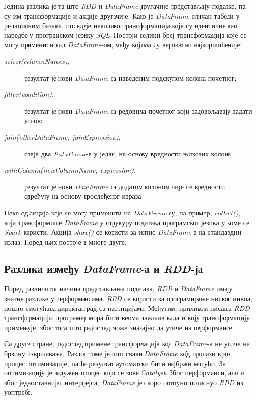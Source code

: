 \documentclass[12pt,oneside]{memoir}
\begin{document}
Једина разлика је та што \textit{RDD} и \textit{DataFrame} другачије представљају податке, па су им трансформације и акције другачије. Како је \textit{DataFrame} сличан табели у релационим базама, поседује неколико трансформација које су идентичне као наредбе у програмском језику \textit{SQL}. Постоји велики број трансформација које се могу применити над \textit{DataFrame}-ом, међу којима су вероватно најкоришћеније: \cite{spark_guide}

\begin{description} 
	\item[\textit{select(columnNames)},] резултат је нови \textit{DataFrame} са наведеним подскупом колона почетног;
	\item[\textit{filter(condition)},] резултат је нови \textit{DataFrame} са редовима почетног који задовољавају задати услов;
	\item[\textit{join(otherDataFrame, joinExpression)},] спаја два \textit{DataFrame}-а у један, на основу вредности њихових колона;
	\item[\textit{withColumn(newColumnName, expression)},] резултат је нови \textit{DataFrame} са додатом колоном чије се вредности одређују на основу прослеђеног израза.
\end{description}

Неке од акција које се могу применити на \textit{DataFrame} су, на пример, \textit{collect()}, која трансформише \textit{DataFrame} у струкуру података програмског језика у коме се \textit{Spark} користи. Акција \textit{show()} се користи за испис \textit{DataFrame}-а на стандардни излаз. Поред њих постоје и многе друге. \cite{spark_guide}

\subsection{Разлика између \textit{DataFrame}-а и \textit{RDD}-ја}
\label{subsec:spark_df_vs_rdd}

Поред различитог начина представљања података, \textit{RDD} и \textit{DataFrame} имају знатне разлике у перформансама. \textit{ RDD} се користи за програмирање ниског нивоа, пошто омогућава директан рад са партицијама. Међутим, приликом писања \textit{RDD} трансформација, програмер мора бити веома пажљив када и коју трансформацију примењује, због тога што редослед може значајно да утиче на перформансе. \cite{spark_guide}

Са друге стране, редослед примене трансформација код \textit{DataFrame}-а не утиче на брзину извршавања. Разлог томе је што сваки \textit{DataFrame} к\^{о}д пролази кроз процес оптимизације, па ће резултат аутоматски бити најбржи могући. За оптимизацију је задужен процес који се зове \textit{Catalyst}. Због перформанси, али и због једноставнијег интерфејса, \textit{DataFrame} је скоро потпуно потиснуо \textit{RDD} из уоптребе. \cite{spark_guide}
\end{document}
